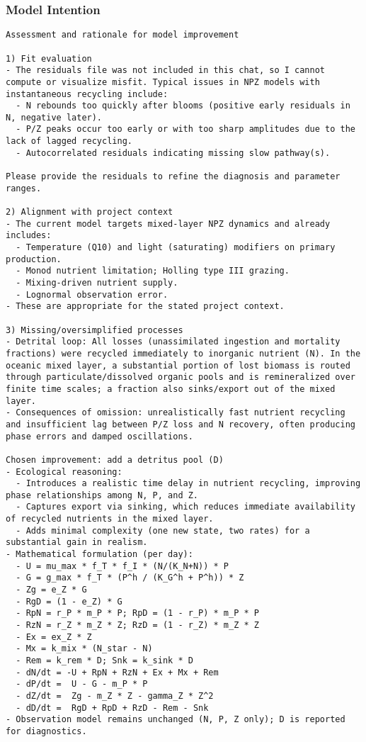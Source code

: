 \subsubsection{Model Intention}
\begin{lstlisting}
Assessment and rationale for model improvement

1) Fit evaluation
- The residuals file was not included in this chat, so I cannot compute or visualize misfit. Typical issues in NPZ models with instantaneous recycling include:
  - N rebounds too quickly after blooms (positive early residuals in N, negative later).
  - P/Z peaks occur too early or with too sharp amplitudes due to the lack of lagged recycling.
  - Autocorrelated residuals indicating missing slow pathway(s).

Please provide the residuals to refine the diagnosis and parameter ranges.

2) Alignment with project context
- The current model targets mixed-layer NPZ dynamics and already includes:
  - Temperature (Q10) and light (saturating) modifiers on primary production.
  - Monod nutrient limitation; Holling type III grazing.
  - Mixing-driven nutrient supply.
  - Lognormal observation error.
- These are appropriate for the stated project context.

3) Missing/oversimplified processes
- Detrital loop: All losses (unassimilated ingestion and mortality fractions) were recycled immediately to inorganic nutrient (N). In the oceanic mixed layer, a substantial portion of lost biomass is routed through particulate/dissolved organic pools and is remineralized over finite time scales; a fraction also sinks/export out of the mixed layer.
- Consequences of omission: unrealistically fast nutrient recycling and insufficient lag between P/Z loss and N recovery, often producing phase errors and damped oscillations.

Chosen improvement: add a detritus pool (D)
- Ecological reasoning:
  - Introduces a realistic time delay in nutrient recycling, improving phase relationships among N, P, and Z.
  - Captures export via sinking, which reduces immediate availability of recycled nutrients in the mixed layer.
  - Adds minimal complexity (one new state, two rates) for a substantial gain in realism.
- Mathematical formulation (per day):
  - U = mu_max * f_T * f_I * (N/(K_N+N)) * P
  - G = g_max * f_T * (P^h / (K_G^h + P^h)) * Z
  - Zg = e_Z * G
  - RgD = (1 - e_Z) * G
  - RpN = r_P * m_P * P; RpD = (1 - r_P) * m_P * P
  - RzN = r_Z * m_Z * Z; RzD = (1 - r_Z) * m_Z * Z
  - Ex = ex_Z * Z
  - Mx = k_mix * (N_star - N)
  - Rem = k_rem * D; Snk = k_sink * D
  - dN/dt = -U + RpN + RzN + Ex + Mx + Rem
  - dP/dt =  U - G - m_P * P
  - dZ/dt =  Zg - m_Z * Z - gamma_Z * Z^2
  - dD/dt =  RgD + RpD + RzD - Rem - Snk
- Observation model remains unchanged (N, P, Z only); D is reported for diagnostics.


\end{lstlisting}
